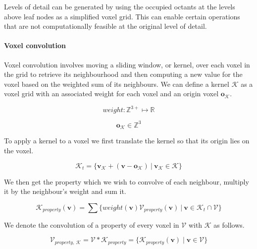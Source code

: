 Levels of detail can be generated by using the occupied octants at the levels above leaf nodes as a simplified voxel grid. This can enable certain operations that are not computationally feasible at the original level of detail.

\paragraph{Voxel convolution}
Voxel convolution involves moving a sliding window, or kernel, over each voxel in the grid to retrieve its neighbourhood and then computing a new value for the voxel based on the weighted sum of its neighbours. We can define a kernel \(\mathcal{K}\) as a voxel grid with an associated weight for each voxel and an origin voxel \(\boldsymbol{o}_{\mathcal{K}}\).

\begin{equation}
weight: \mathbb{Z}^{3+} \mapsto \mathbb{R}
\end{equation}

\begin{equation}
\boldsymbol{o}_{\mathcal{K}} \in \mathbb{Z}^{3}
\end{equation}

To apply a kernel to a voxel we first translate the kernel so that its origin lies on the voxel.

\begin{equation}
    \label{eq:kv}
\mathcal{K}_t = \{\boldsymbol{v_{\mathcal{K}}} + (\boldsymbol{v} - \boldsymbol{o_{\mathcal{K}}})\ |\ \boldsymbol{v_{\mathcal{K}}} \in \mathcal{K}\}
\end{equation}

We then get the property which we wish to convolve of each neighbour, multiply it by the neighbour's weight and sum it.

\begin{equation}
    \label{eq:kw}
    \mathcal{K}_{property}(\boldsymbol{v}) = \sum \{weight(\boldsymbol{v})\mathcal{V}_{property}(\boldsymbol{v})\ |\ \boldsymbol{v} \in \mathcal{K}_{t} \cap \mathcal{V}\}
\end{equation}

We denote the convolution of a property of every voxel in \(\mathcal{V}\) with \(\mathcal{K}\) as follows.

\begin{equation}
    \label{eq:c}
    \mathcal{V}_{property,\  \mathcal{K}} = \mathcal{V} * \mathcal{K}_{property} = \{\mathcal{K}_{property}(\boldsymbol{v}) \mid \boldsymbol{v} \in \mathcal{V}\}
\end{equation}


